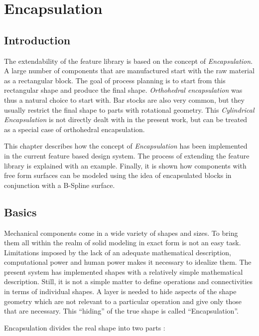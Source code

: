 \chapter{Encapsulation}


	\section{Introduction}

	The extendability of the feature library is based on the concept of
	{\em Encapsulation}.
	A large number of components that are manufactured start with the raw 
	material as a rectangular block. The goal of process planning is to start 
	from this rectangular shape and produce the final shape. 
	{\em Orthohedral encapsulation } was thus a natural choice to start with. 
	Bar stocks are also very common, but they usually restrict the final shape 
	to parts with rotational geometry. This {\em Cylindrical 
	Encapsulation} is not directly dealt with in the present work, but can
	be treated as a special case of orthohedral encapsulation.

	This chapter describes how the concept of {\em Encapsulation} has been 
	implemented in the current feature based design system. The process of 
	extending the feature library is explained with an example. Finally,
	it is shown how components with free form surfaces can be modeled using
	the idea of encapsulated blocks in conjunction with a B-Spline surface.

	\section{Basics}

	Mechanical components come in a wide variety of shapes and sizes. To 
	bring them all within the realm of solid modeling in exact form is not 
	an easy task. Limitations imposed by the lack of an adequate mathematical 
	description, computational power and human power
	makes it necessary to idealize them. The present system has implemented
	shapes with a relatively simple mathematical description. Still, it 
	is not a simple matter
	to define operations and connectivities in terms of individual shapes.
	A layer is needed to hide aspects of the shape geometry 
	which are not relevant to a particular operation and give only those
	that are necessary.  This ``hiding'' of the true shape is called 
	``Encapsulation''.

		Encapsulation divides the real shape into two parts :


